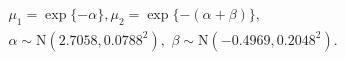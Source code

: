 \begin{gather}
  \mu_{1} = \exp\{-\alpha\}, 
  \mu_{2} = \exp\{-(\alpha + \beta)\}, \,\, \\ 
  \alpha \sim \text{N}(2.7058, 0.0788^2), \,\, 
  \beta \sim \text{N}(-0.4969, 0.2048^2).
  \label{eqn:prior-set-two}
\end{gather}